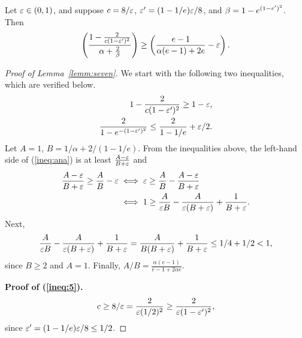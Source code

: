 \begin{lemma} \label{lemm:seven}
  Let $\varepsilon \in (0,1)$, and suppose
  $c = 8 / \varepsilon$, $\varepsilon' = (1 - 1/e) \varepsilon / 8$,
  and $\beta = 1 - e^{(1 - \varepsilon')^2}$.
  Then
  \begin{equation}\left( \frac{1 - \frac{2}{c(1-\varepsilon')^2}}{\alpha + 
    \frac{2}{\beta}} \right) \ge \left( \frac{e - 1}{\alpha(e - 1) + 2e} - \varepsilon  
    \right). \label{ineq:ana}
  \end{equation}
\end{lemma}
\begin{proof}[Proof of Lemma~\ref{lemm:seven}]
  We start with the following two inequalities, which are verified below.
  \begin{align}
    1 - \frac{2}{c(1-\varepsilon')^2} \ge 1 - \varepsilon& ,\label{ineq:5} \\
    \frac{2}{1 - e^{-(1 - \varepsilon')^2}} \le \frac{2}{1 - 1/e} + \varepsilon / 2& .\label{ineq:7}
  \end{align}
  Let $A = 1$, $B = 1 / \alpha + 2/(1 - 1/e)$. 
  From the inequalities above,
  the left-hand side of (\ref{ineq:ana})
  is at least $\frac{A - \varepsilon}{B + \varepsilon}$ and
  \begin{align*}
    \frac{A - \varepsilon}{B + \varepsilon} \ge \frac{A}{B} - \varepsilon &\iff \varepsilon \ge \frac{A}{B} - \frac{A - \varepsilon}{B + \varepsilon} \\
                                                     &\iff 1 \ge \frac{A}{\varepsilon B} - \frac{A}{\varepsilon (B + \varepsilon )} + \frac{1}{B + \varepsilon}.
  \end{align*}
  Next,
  \begin{align*}
    \frac{A}{\varepsilon B} - \frac{A}{\varepsilon (B + \varepsilon )} + \frac{1}{B + \varepsilon} = \frac{A}{B (B + \varepsilon )} + \frac{1}{B + \varepsilon} \le 1/4 + 1/2 < 1,
  \end{align*}
  since $B \ge 2$ and $A = 1$. Finally, $A/B = \frac{\alpha (e - 1)}{e - 1 + 2\alpha e}$.

  \textbf{Proof of (\ref{ineq:5}).}
  \begin{align*}
    c \ge 8 / \varepsilon = \frac{2}{\varepsilon (1/2)^2} \ge \frac{2}{\varepsilon(1 - \varepsilon')^2},
  \end{align*}
  since $\varepsilon' = (1 - 1/e) \varepsilon / 8 \le 1/2$.



\end{proof}
